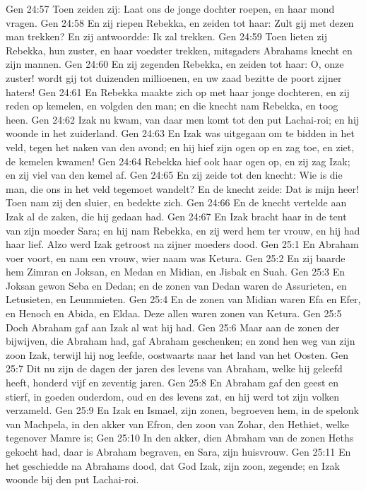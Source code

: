 Gen 24:57  Toen zeiden zij: Laat ons de jonge dochter roepen, en haar mond vragen.
Gen 24:58  En zij riepen Rebekka, en zeiden tot haar: Zult gij met dezen man trekken? En zij antwoordde: Ik zal trekken.
Gen 24:59  Toen lieten zij Rebekka, hun zuster, en haar voedster trekken, mitsgaders Abrahams knecht en zijn mannen.
Gen 24:60  En zij zegenden Rebekka, en zeiden tot haar: O, onze zuster! wordt gij tot duizenden millioenen, en uw zaad bezitte de poort zijner haters!
Gen 24:61  En Rebekka maakte zich op met haar jonge dochteren, en zij reden op kemelen, en volgden den man; en die knecht nam Rebekka, en toog heen.
Gen 24:62  Izak nu kwam, van daar men komt tot den put Lachai-roi; en hij woonde in het zuiderland.
Gen 24:63  En Izak was uitgegaan om te bidden in het veld, tegen het naken van den avond; en hij hief zijn ogen op en zag toe, en ziet, de kemelen kwamen!
Gen 24:64  Rebekka hief ook haar ogen op, en zij zag Izak; en zij viel van den kemel af.
Gen 24:65  En zij zeide tot den knecht: Wie is die man, die ons in het veld tegemoet wandelt? En de knecht zeide: Dat is mijn heer! Toen nam zij den sluier, en bedekte zich.
Gen 24:66  En de knecht vertelde aan Izak al de zaken, die hij gedaan had.
Gen 24:67  En Izak bracht haar in de tent van zijn moeder Sara; en hij nam Rebekka, en zij werd hem ter vrouw, en hij had haar lief. Alzo werd Izak getroost na zijner moeders dood.
Gen 25:1  En Abraham voer voort, en nam een vrouw, wier naam was Ketura.
Gen 25:2  En zij baarde hem Zimran en Joksan, en Medan en Midian, en Jisbak en Suah.
Gen 25:3  En Joksan gewon Seba en Dedan; en de zonen van Dedan waren de Assurieten, en Letusieten, en Leummieten.
Gen 25:4  En de zonen van Midian waren Efa en Efer, en Henoch en Abida, en Eldaa. Deze allen waren zonen van Ketura.
Gen 25:5  Doch Abraham gaf aan Izak al wat hij had.
Gen 25:6  Maar aan de zonen der bijwijven, die Abraham had, gaf Abraham geschenken; en zond hen weg van zijn zoon Izak, terwijl hij nog leefde, oostwaarts naar het land van het Oosten.
Gen 25:7  Dit nu zijn de dagen der jaren des levens van Abraham, welke hij geleefd heeft, honderd vijf en zeventig jaren.
Gen 25:8  En Abraham gaf den geest en stierf, in goeden ouderdom, oud en des levens zat, en hij werd tot zijn volken verzameld.
Gen 25:9  En Izak en Ismael, zijn zonen, begroeven hem, in de spelonk van Machpela, in den akker van Efron, den zoon van Zohar, den Hethiet, welke tegenover Mamre is;
Gen 25:10  In den akker, dien Abraham van de zonen Heths gekocht had, daar is Abraham begraven, en Sara, zijn huisvrouw.
Gen 25:11  En het geschiedde na Abrahams dood, dat God Izak, zijn zoon, zegende; en Izak woonde bij den put Lachai-roi.
